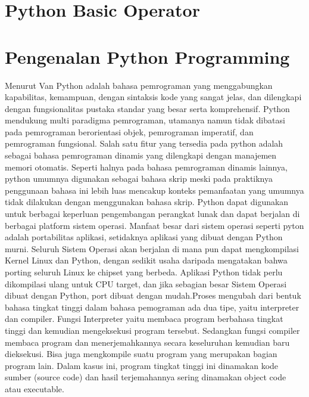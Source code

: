 
\section{Python Basic Operator} 
\section{Pengenalan Python Programming}
Menurut Van Python adalah bahasa pemrograman yang menggabungkan kapabilitas, kemampuan, dengan sintaksis kode yang sangat jelas, dan dilengkapi dengan fungsionalitas pustaka standar yang besar serta komprehensif. Python mendukung multi paradigma pemrograman, utamanya namun tidak dibatasi pada pemrograman berorientasi objek, pemrograman imperatif, dan pemrograman fungsional. Salah satu fitur yang tersedia pada python adalah sebagai bahasa pemrograman dinamis yang dilengkapi dengan manajemen memori otomatis. Seperti halnya pada bahasa pemrograman dinamis lainnya, python umumnya digunakan sebagai bahasa skrip meski pada praktiknya penggunaan bahasa ini lebih luas mencakup konteks pemanfaatan yang umumnya tidak dilakukan dengan menggunakan bahasa skrip. Python dapat digunakan untuk berbagai keperluan pengembangan perangkat lunak dan dapat berjalan di berbagai platform sistem operasi. Manfaat besar dari sistem operasi seperti pyton adalah portabilitas aplikasi, setidaknya aplikasi yang dibuat dengan Python murni. Seluruh Sistem Operasi akan berjalan di mana pun dapat mengkompilasi Kernel Linux dan Python, dengan sedikit usaha daripada mengatakan bahwa porting seluruh Linux ke chipset yang berbeda. Aplikasi Python tidak perlu dikompilasi ulang untuk CPU target, dan jika sebagian besar Sistem Operasi dibuat dengan Python, port dibuat dengan mudah.Proses mengubah dari bentuk bahasa tingkat tinggi dalam bahasa pemograman ada dua tipe, yaitu interpreter dan compiler. Fungsi Interpreter yaitu membaca program berbahasa tingkat tinggi dan kemudian mengeksekusi program tersebut. Sedangkan fungsi compiler membaca program dan menerjemahkannya secara keseluruhan kemudian baru dieksekusi. Bisa juga mengkompile suatu program yang merupakan bagian program lain. Dalam kasus ini, program tingkat tinggi ini dinamakan kode sumber (source code) dan hasil terjemahannya sering dinamakan object code atau executable.  \cite{van2007python}

